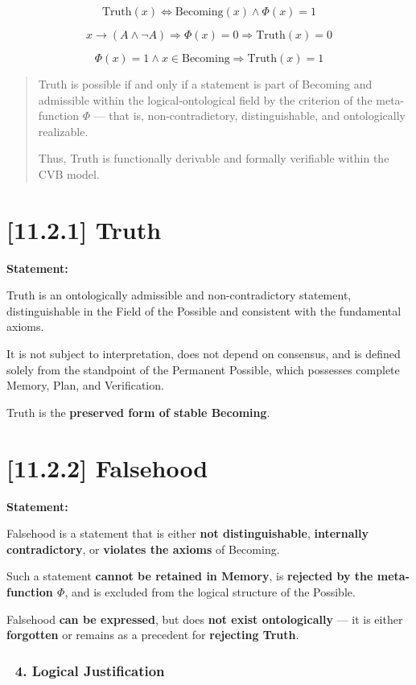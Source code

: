 \documentclass[12pt]{article}
\begin{document}
\[
\text{Truth}(x) \iff \text{Becoming}(x) \land \Phi(x) = 1
\]

\[
x \rightarrow (A \land \neg A) \Rightarrow \Phi(x) = 0 \Rightarrow \text{Truth}(x) = 0
\]

\[
\Phi(x) = 1 \land x \in \text{Becoming} \Rightarrow \text{Truth}(x) = 1
\]

\begin{quote}
Truth is possible if and only if a statement is part of Becoming and admissible within the logical-ontological field by the criterion of the meta-function $\Phi$ — that is, non-contradictory, distinguishable, and ontologically realizable.

Thus, Truth is functionally derivable and formally verifiable within the CVB model.
\end{quote}

\section*{[11.2.1] Truth}

\textbf{Statement:}

Truth is an ontologically admissible and non-contradictory statement, distinguishable in the Field of the Possible and consistent with the fundamental axioms.

It is not subject to interpretation, does not depend on consensus, and is defined solely from the standpoint of the Permanent Possible, which possesses complete Memory, Plan, and Verification.

Truth is the \textbf{preserved form of stable Becoming}.

\section*{[11.2.2] Falsehood}

\textbf{Statement:}

Falsehood is a statement that is either \textbf{not distinguishable}, \textbf{internally contradictory}, or \textbf{violates the axioms} of Becoming.

Such a statement \textbf{cannot be retained in Memory}, is \textbf{rejected by the meta-function $\Phi$}, and is excluded from the logical structure of the Possible.

Falsehood \textbf{can be expressed}, but does \textbf{not exist ontologically} — it is either \textbf{forgotten} or remains as a precedent for \textbf{rejecting Truth}.

\subsubsection*{🔹 4. Logical Justification}
\end{document}
